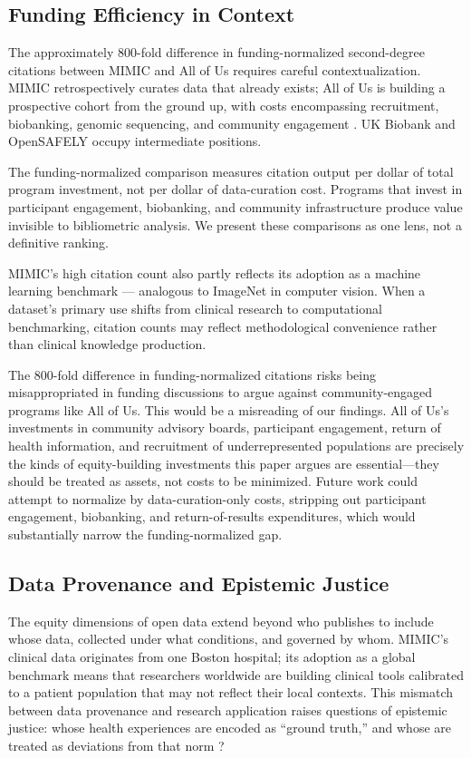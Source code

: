 \documentclass[11pt]{article}
\begin{document}
\subsection{Funding Efficiency in Context}

The approximately 800-fold difference in funding-normalized second-degree citations between MIMIC and All of Us requires careful contextualization.
MIMIC retrospectively curates data that already exists; All of Us is building a prospective cohort from the ground up, with costs encompassing recruitment, biobanking, genomic sequencing, and community engagement \cite{allofus2019,haendel2021nhgri}.
UK Biobank and OpenSAFELY occupy intermediate positions.

The funding-normalized comparison measures citation output per dollar of total program investment, not per dollar of data-curation cost.
Programs that invest in participant engagement, biobanking, and community infrastructure produce value invisible to bibliometric analysis.
We present these comparisons as one lens, not a definitive ranking.

MIMIC's high citation count also partly reflects its adoption as a machine learning benchmark --- analogous to ImageNet in computer vision.
When a dataset's primary use shifts from clinical research to computational benchmarking, citation counts may reflect methodological convenience rather than clinical knowledge production.

The 800-fold difference in funding-normalized citations risks being misappropriated in funding discussions to argue against community-engaged programs like All of Us. This would be a misreading of our findings. All of Us's investments in community advisory boards, participant engagement, return of health information, and recruitment of underrepresented populations are precisely the kinds of equity-building investments this paper argues are essential---they should be treated as assets, not costs to be minimized. Future work could attempt to normalize by data-curation-only costs, stripping out participant engagement, biobanking, and return-of-results expenditures, which would substantially narrow the funding-normalized gap.

\subsection{Data Provenance and Epistemic Justice}

The equity dimensions of open data extend beyond who publishes to include whose data, collected under what conditions, and governed by whom. MIMIC's clinical data originates from one Boston hospital; its adoption as a global benchmark means that researchers worldwide are building clinical tools calibrated to a patient population that may not reflect their local contexts. This mismatch between data provenance and research application raises questions of epistemic justice: whose health experiences are encoded as ``ground truth,'' and whose are treated as deviations from that norm \cite{fricker2007epistemic}?
\end{document}
